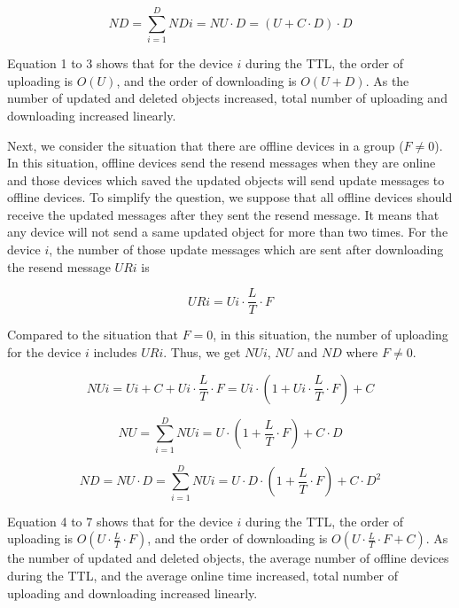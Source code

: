 \documentclass[twocolumn,10pt]{article}
\begin{document}
\begin{equation}
ND = \sum_{i=1}^{D} NDi = NU \cdot D =  (U + C \cdot D) \cdot D
\end{equation}

Equation 1 to 3 shows that for the device $i$ during the TTL, the order of uploading  is $O(U)$, and the order of downloading is $O(U+D)$.
As the number of updated and deleted objects increased, total number of uploading and downloading increased linearly.

Next, we consider the situation that there are offline devices in a group ($F \neq 0$).
In this situation, offline devices send the resend messages when they are online and those devices which saved the updated objects will send update messages to offline devices.
To simplify the question, we suppose that all offline devices should receive the updated messages after they sent the resend message.
It means that any device will not send a same updated object for more than two times.
For the device $i$, the number of those update messages which are sent after downloading the resend message $URi$ is

\begin{equation}
URi = Ui \cdot \frac{L}{T} \cdot F
\end{equation}

Compared to the situation that $F=0$, in this situation, the number of uploading for the device $i$ includes $URi$.
Thus, we get $NUi$, $NU$ and $ND$ where $F \neq 0$.

\begin{equation}
NUi = Ui + C + Ui \cdot \frac{L}{T} \cdot F = Ui \cdot (1 + Ui \cdot \frac{L}{T} \cdot F) + C
\end{equation}

\begin{equation}
NU = \sum_{i=1}^{D} NUi = U \cdot (1 + \frac{L}{T} \cdot F) + C \cdot D
\end{equation}

\begin{equation}
ND = NU \cdot D = \sum_{i=1}^{D} NUi = U \cdot D \cdot (1 + \frac{L}{T} \cdot F) + C \cdot D^{2}
\end{equation}

Equation 4 to 7 shows that for the device $i$ during the TTL, the order of uploading is $O(U \cdot \frac{L}{T} \cdot F)$, and the order of downloading is $O(U \cdot \frac{L}{T} \cdot F + C)$.
As the number of updated and deleted objects, the average number of offline devices during the TTL, and the average online time increased, total number of uploading and downloading increased linearly.
\end{document}
